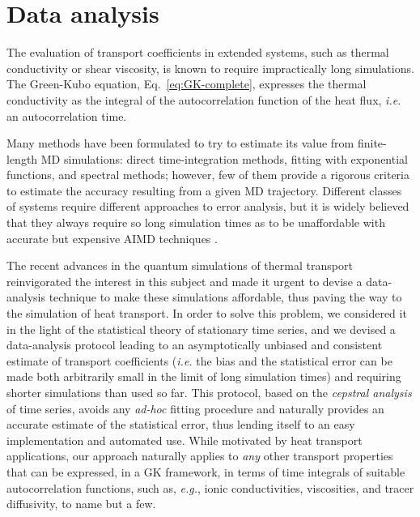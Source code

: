 \chapter{Data analysis}  \label{ch:data-analysis}

\begin{LEtext}
The evaluation of transport coefficients in extended systems, such as thermal conductivity or shear viscosity, is known to require impractically long simulations. The Green-Kubo equation, Eq.~\eqref{eq:GK-complete}, expresses the thermal conductivity as the integral of the autocorrelation function of the heat flux, \emph{i.e.} an autocorrelation time. 

Many methods have been formulated to try to estimate its value from finite-length MD simulations: direct time-integration methods, fitting with exponential functions, and spectral methods; however, few of them provide a rigorous criteria to estimate the accuracy resulting from a given MD trajectory. Different classes of systems require different approaches to error analysis, but it is widely believed that they always require so long simulation times as to be unaffordable with accurate but expensive AIMD techniques \citep{Carbogno:2017gc}. 

The recent advances in the quantum simulations of thermal transport reinvigorated the interest in this subject and made it urgent to devise a data-analysis technique to make these simulations affordable, thus paving the way to the \abinitio simulation of heat transport.
In order to solve this problem, we considered it in the light of the statistical theory of stationary time series, and we devised a data-analysis protocol leading to an asymptotically unbiased and consistent estimate of transport coefficients (\emph{i.e.} the bias and the statistical error can be made both arbitrarily small in the limit of long simulation times) and requiring shorter simulations than used so far. This protocol, based on the \emph{cepstral analysis} of time series, avoids any \emph{ad-hoc} fitting procedure and naturally provides an accurate estimate of the statistical error, thus lending itself to an easy implementation and automated use. 
While motivated by heat transport applications, our approach naturally applies to \emph{any} other transport properties that can be expressed, in a GK framework, in terms of time integrals of suitable autocorrelation functions, such as, \emph{e.g.}, ionic conductivities, viscosities, and tracer diffusivity, to name but a few. 


\end{LEtext}
